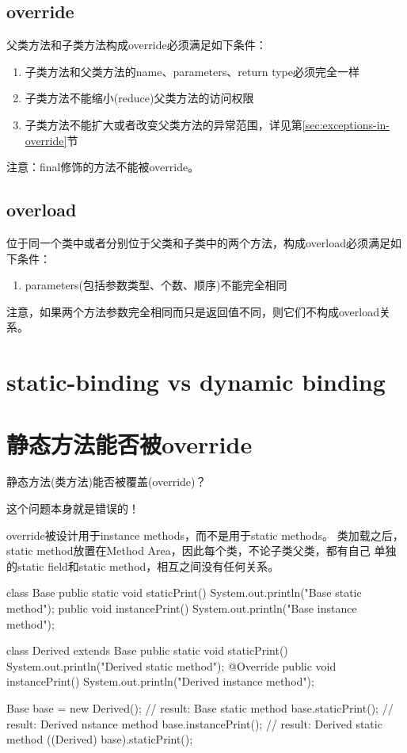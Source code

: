 \documentclass[a4paper,11pt]{article}
\begin{document}
\subsection[override]{override}
父类方法和子类方法构成override必须满足如下条件：

\begin{enumerate}
  \item 子类方法和父类方法的name、parameters、return type必须完全一样
  \item 子类方法不能缩小(reduce)父类方法的访问权限
  \item 子类方法不能扩大或者改变父类方法的异常范围，详见第\ref{sec:exceptions-in-override}节
\end{enumerate}

注意：final修饰的方法不能被override。

\subsection[overload]{overload}
位于同一个类中或者分别位于父类和子类中的两个方法，构成overload必须满足如下条件：

\begin{enumerate}
  \item parameters(包括参数类型、个数、顺序)不能完全相同
\end{enumerate}

注意，如果两个方法参数完全相同而只是返回值不同，则它们不构成overload关系。

\section[static-binding vs dynamic binding]{static-binding vs dynamic binding}

\section[静态方法能否被override]{静态方法能否被override}
静态方法(类方法)能否被覆盖(override)？

这个问题本身就是错误的！

override被设计用于instance methods，而不是用于static methods。
类加载之后，static method放置在Method Area，因此每个类，不论子类父类，都有自己
单独的static field和static method，相互之间没有任何关系。

\begin{javacode}
class Base {
  public static void staticPrint() {
    System.out.println("Base static method");
  }
  public void instancePrint() {
    System.out.println("Base instance method");
  }
}

class Derived extends Base {
  public static void staticPrint() {
    System.out.println("Derived static method");
  }
  @Override
  public void instancePrint() {
    System.out.println("Derived instance method");
  }
}

Base base = new Derived();
// result: Base static method
base.staticPrint();
// result: Derived nstance method
base.instancePrint();
// result: Derived static method
((Derived) base).staticPrint();
\end{javacode}
\end{document}
